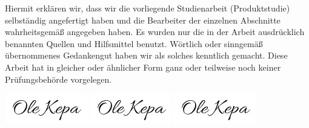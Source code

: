 \documentclass[
  letterpaper,
  DIV=11]{scrartcl}
\begin{document}
Hiermit erklären wir, dass wir die vorliegende Studienarbeit
(Produktstudie) selbständig angefertigt haben und die Bearbeiter der
einzelnen Abschnitte wahrheitsgemäß angegeben haben. Es wurden nur die
in der Arbeit ausdrücklich benannten Quellen und Hilfsmittel benutzt.
Wörtlich oder sinngemäß übernommenes Gedankengut haben wir als solches
kenntlich gemacht. Diese Arbeit hat in gleicher oder ähnlicher Form ganz
oder teilweise noch keiner Prüfungsbehörde vorgelegen.

\includegraphics{"./signatures/OleKepa.png"}
\includegraphics{"./signatures/OleKepa.png"}
\includegraphics{"./signatures/OleKepa.png"}
\end{document}

